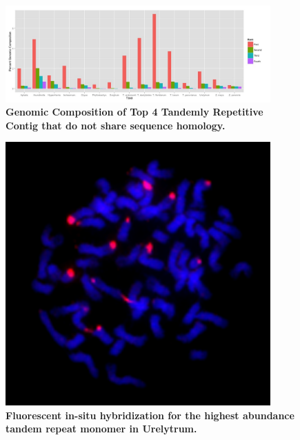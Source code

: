 \documentclass[10pt,letterpaper]{article}
\begin{document}
\begin{figure}[h]
\begin{center}
\includegraphics[width=4in]{Rankstrfcontent.png}
\end{center}
\caption{{\bf Genomic Composition of Top 4 Tandemly Repetitive Contig that do not share sequence homology.}
}
\label{ranktrf}
\end{figure}

\begin{figure}[h]
\begin{center}
\includegraphics[width=4in]{Udig_TK271-Repeat.png}
\end{center}
\caption{{\bf Fluorescent in-situ hybridization for the highest abundance tandem repeat monomer in Urelytrum.}}
\label{FISH}
\end{figure}
\end{document}

